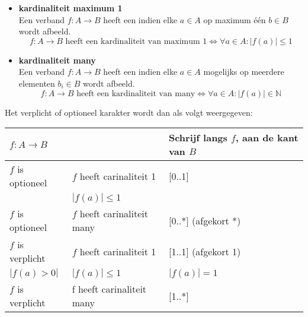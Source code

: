 \documentclass[../main.tex]{subfiles}
\begin{document}
\begin{itemize}
	\item \textbf{kardinaliteit maximum 1} \\
	Een verband $f: A \rightarrow B$ heeft een  indien elke $a \in A$ op maximum \'e\'en $b \in B$ wordt afbeeld.\\
	\begin{equation*}
	\boxed{f:A \rightarrow B \textrm{ heeft een kardinaliteit van maximum 1} \Leftrightarrow \forall a \in A:|f(a)| \leq 1}
	\end{equation*}
	\item \textbf{kardinaliteit many} \\
	Een verband $f: A \rightarrow B$ heeft een  indien elke $a \in A$ mogelijks op meerdere elementen $b_i \in B$ wordt afbeeld.\\
	\begin{equation*}
	\boxed{f:A \rightarrow B \textrm{ heeft een kardinaliteit van many} \Leftrightarrow \forall a \in A:|f(a)| \in \mathbb{N}}
	\end{equation*}
\end{itemize}

Het verplicht of optioneel karakter wordt dan als volgt weergegeven:
\begin{center}
\begin{tabular}{|l|l|l|}
\hline
$f:A \rightarrow B$ & & Schrijf langs $f$, aan de kant van $B$ \\ \hline
$f$ is optioneel & $f$ heeft carinaliteit 1 & [0..1] \\
& $|f(a)| \leq 1$ & \\ \hline
$f$ is optioneel & $f$ heeft carinaliteit many & [0..*] (afgekort *) \\ \hline \hline
$f$ is verplicht & $f$ heeft carinaliteit 1 & [1..1] (afgekort 1)\\
$|f(a) > 0|$ & $|f(a)| \leq 1$ &  $|f(a)|=1$ \\ \hline
$f$ is verplicht & f heeft carinaliteit many & [1..*]  \\ \hline
\end{tabular}
\end{center}
\end{document}
